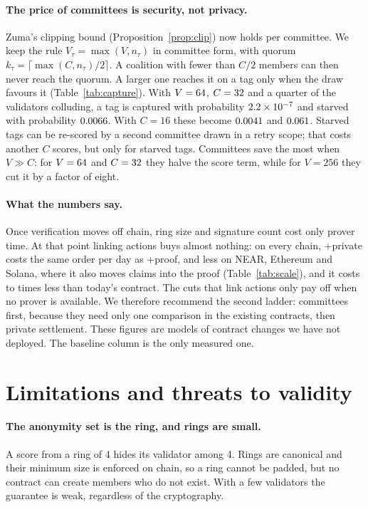 \documentclass[11pt]{article}
\theoremstyle{remark}
\newcommand{\tg}{\tau}
\begin{document}
\paragraph{The price of committees is security, not privacy.} Zuma's clipping bound (Proposition~\ref{prop:clip}) now holds per committee. We keep the rule $V_\tg=\max(V,n_\tg)$ in committee form, with quorum $k_\tg=\lceil\max(C,n_\tg)/2\rceil$. A coalition with fewer than $C/2$ members can then never reach the quorum. A larger one reaches it on a tag only when the draw favours it (Table~\ref{tab:capture}). With $V=64$, $C=32$ and a quarter of the validators colluding, a tag is captured with probability $2.2\times10^{-7}$ and starved with probability $0.0066$. With $C=16$ these become $0.0041$ and $0.061$. Starved tags can be re-scored by a second committee drawn in a retry scope; that costs another $C$ scores, but only for starved tags. Committees save the most when $V\gg C$: for $V=64$ and $C=32$ they halve the score term, while for $V=256$ they cut it by a factor of eight.

\paragraph{What the numbers say.} Once verification moves off chain, ring size and signature count cost only prover time. At that point linking actions buys almost nothing: on every chain, +private costs the same order per day as +proof, and less on NEAR, Ethereum and Solana, where it also moves claims into the proof (Table~\ref{tab:scale}), and it costs \scaleMinRatio{} to \scaleMaxRatio{} times less than today's contract. The cuts that link actions only pay off when no prover is available. We therefore recommend the second ladder: committees first, because they need only one comparison in the existing contracts, then private settlement. These figures are models of contract changes we have not deployed. The baseline column is the only measured one.

\section{Limitations and threats to validity}\label{sec:limits}

\paragraph{The anonymity set is the ring, and rings are small.} A score from a ring of 4 hides its validator among 4. Rings are canonical and their minimum size is enforced on chain, so a ring cannot be padded, but no contract can create members who do not exist. With a few validators the guarantee is weak, regardless of the cryptography.
\end{document}
